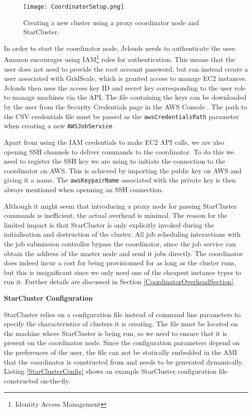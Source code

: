 \begin{figure}[h]
	\centering
		\texttt{[image: CoordinatorSetup.png]}
	\caption{Creating a new cluster using a proxy coordinator node and StarCluster.}
	\label{CoordinatorSetup}
\end{figure}

In order to start the coordinator node, Jclouds needs to authenticate the user. Amazon encourages using IAM\footnote{Identity Access Management} roles for authentication. This means that the user does not need to provide the root account password, but can instead create a user associated with GridScale, which is granted access to manage EC2 instances. Jclouds then uses the access key ID and secret key corresponding to the user role to manage machines via the API. The file containing the keys can be downloaded by the user from the Security Credentials page in the AWS Console \cite{AWSCredentials}. The path to the CSV credentials file must be passed as the \verb|awsCredentialsPath| parameter when creating a new \verb|AWSJobService|.

Apart from using the IAM credentials to make EC2 API calls, we are also opening SSH channels to deliver commands to the coordinator. To do this we need to register the SSH key we are using to initiate the connection to the coordinator on AWS. This is achieved by importing the public key on AWS and giving it a name. The \verb|awsKeypairName| associated with the private key is then always mentioned when openning an SSH connection.

Although it might seem that introducing a proxy node for passing StarCluster commands is inefficient, the actual overhead is minimal. The reason for the limited impact is that StarCluster is only explicitly invoked during the initialisation and destruction of the cluster. All job scheduling interactions with the job submission controller bypass the coordinator, since the job service can obtain the address of the master node and send it jobs directly. The coordinator does indeed incur a cost for being provisionned for as long as the cluster runs, but this is insignificant since we only need one of the cheapest instance types to run it. Further details are discussed in Section \ref{CoordinatorOverheadSection}.

\vspace{3mm}
\textbf{StarCluster Configuration}
\vspace{1mm}

StarCluster relies on a configuration file instead of command line parameters to specify the characteristics of clusters it is creating. The file must be located on the machine where StarCluster is being run, so we need to ensure that it is present on the coordinator node. Since the configuration parameters depend on the preferences of the user, the file can not be statically embedded in the AMI that the coordinator is constructed from and needs to be generated dynamically. Listing \ref{StarClusterConfig} shows an example StarCluster configuration file constructed on-the-fly.

